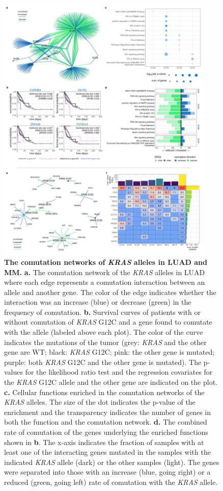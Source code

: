 \documentclass[english, 10pt, letterpaper]{article}
\newcommand{\KRAS}{\emph{KRAS}}
\begin{document}
\begin{figure}[p]
\centering
\includegraphics[height=130mm]{figures/Figure_03.jpeg}
\caption{
    \textbf{The comutation networks of \KRAS{} alleles in LUAD and MM.}
    \textbf{a.} The comutation network of the \KRAS{} alleles in LUAD where each edge represents a comutation interaction between an allele and another gene. The color of the edge indicates whether the interaction was an increase (blue) or decrease (green) in the frequency of comutation.
    \textbf{b.} Survival curves of patients with or without comutation of \KRAS{} G12C and a gene found to comutate with the allele (labeled above each plot). The color of the curve indicates the mutations of the tumor (grey: \KRAS{} and the other gene are WT; black: \KRAS{} G12C; pink: the other gene is mutated; purple: both \KRAS{} G12C and the other gene is mutated). The p-values for the likelihood ratio test and the regression covariates for the \KRAS{} G12C allele and the other gene are indicated on the plot.
    \textbf{c.} Cellular functions enriched in the comutation networks of the \KRAS{} alleles. The size of the dot indicates the p-value of the enrichment and the transparency indicates the number of genes in both the function and the comutation network.
    \textbf{d.} The combined rate of comutation of the genes underlying the enriched functions shown in \textbf{b}. The x-axis indicates the fraction of samples with at least one of the interacting genes mutated in the samples with the indicated \KRAS{} allele (dark) or the other samples (light). The genes were separated into those with an increase (blue, going right) or a reduced (green, going left) rate of comutation with the \KRAS{} allele.
}
\end{figure}
\end{document}
